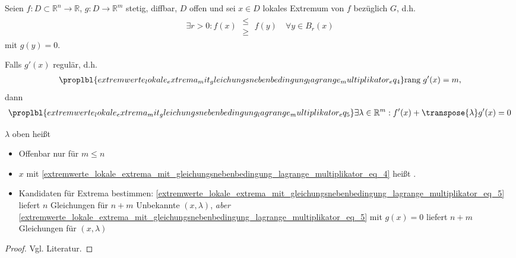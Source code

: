 \begin{proposition}
	Seien $f:D\subset\mathbb{R}^n\to\mathbb{R}$, $g:D\to\mathbb{R}^m$ stetig, \gls{diffbar}, $D$ offen und sei $x\in D$ lokales Extremum von $f$ bezüglich $G$, d.h. \begin{align*}\exists r > 0: f(x)\; \substack{\le \\ \ge}\; f(y)\quad\forall y\in B_r(x)\end{align*} mit $g(y) = 0$.
	
	Falls $g'(x)$ regulär, d.h. \begin{align}
		\proplbl{extremwerte_lokale_extrema_mit_gleichungsnebenbedingung_lagrange_multiplikator_eq_4}
	\mathrm{rang}\; g'(x) = m, \end{align}dann
	\begin{align}
	\proplbl{extremwerte_lokale_extrema_mit_gleichungsnebenbedingung_lagrange_multiplikator_eq_5}
	\exists \lambda\in\mathbb{R}^m: f'(x) + \transpose{\lambda} g'(x) = 0\end{align}
\end{proposition}

\begin{*definition}
	$\lambda$ oben heißt 
\end{*definition}

\begin{remark}\vspace*{0pt}
\begin{itemize}
	\item Offenbar nur für $m\le n$
	\item $x$ mit \eqref{extremwerte_lokale_extrema_mit_gleichungsnebenbedingung_lagrange_multiplikator_eq_4} heißt .
	\item Kandidaten für Extrema bestimmen: \eqref{extremwerte_lokale_extrema_mit_gleichungsnebenbedingung_lagrange_multiplikator_eq_5} liefert $n$ Gleichungen für $n+m$ Unbekannte $(x,\lambda)$, \emph{aber} \eqref{extremwerte_lokale_extrema_mit_gleichungsnebenbedingung_lagrange_multiplikator_eq_5} mit $g(x) = 0$ liefert $n+m$ Gleichungen für $(x,\lambda)$
\end{itemize}
\end{remark}

\begin{proof}
	Vgl. Literatur.
\end{proof}

